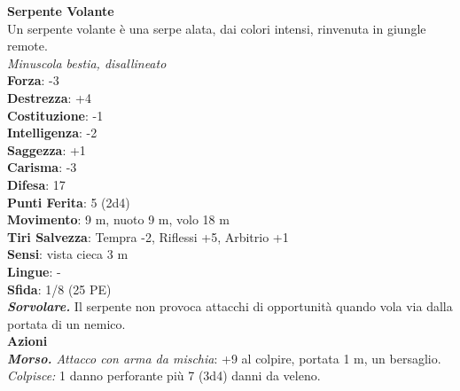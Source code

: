 \begin{multicols}{2}
\medskip\textbf{Serpente Volante}\\
Un serpente volante è una serpe alata, dai colori intensi, rinvenuta in giungle remote.\\
\emph{Minuscola bestia, disallineato}\\
\textbf{Forza}: -3\\
\textbf{Destrezza}: +4\\
\textbf{Costituzione}: -1\\
\textbf{Intelligenza}: -2\\
\textbf{Saggezza}: +1\\
\textbf{Carisma}: -3\\
\textbf{Difesa}: 17\\
\textbf{Punti Ferita}: 5 (2d4)\\
\textbf{Movimento}: 9 m, nuoto 9 m, volo 18 m\\
\textbf{Tiri Salvezza}: Tempra -2, Riflessi +5, Arbitrio +1\\
\textbf{Sensi}: vista cieca 3 m\\
\textbf{Lingue}: -\\
\textbf{Sfida}: 1/8 (25 PE)\smallskip\\
\emph{\textbf{Sorvolare.}} Il serpente non provoca attacchi di opportunità quando vola via dalla portata di un nemico.\\
\smallskip\textbf{Azioni}\\
\emph{\textbf{Morso.} Attacco con arma da mischia}: +9 al colpire, portata 1 m, un bersaglio.\\
\emph{Colpisce:} 1 danno perforante più 7 (3d4) danni da veleno.\\


\end{multicols}
